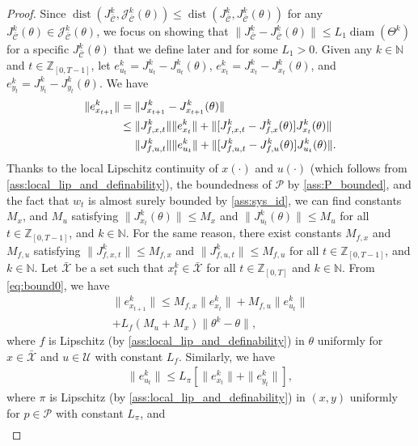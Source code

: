 \documentclass[journal,twoside,web,final]{ieeecolor}
\theoremstyle{definition}
\newcommand{\Z}{\mathbb{Z}}
\newcommand{\N}{\mathbb{N}}
\newcommand{\J}{\mathcal{J}}
\newcommand{\Cb}{{\bar{\mathcal{C}}}}
\begin{document}
\begin{proof}
%
Since $\operatorname*{dist}(J^k_\Cb,\J_\Cb^k(\theta)) \leq \operatorname*{dist}(J^k_\Cb,J_\Cb^k(\theta)) $ for any $J_\Cb^k(\theta)\in\J_\Cb^k(\theta)$, we focus on showing that $\|J_\Cb^k-J_\Cb^k(\theta)\| \leq L_1 \operatorname*{diam}(\Theta^k)$ for a specific $J_\Cb^k(\theta)$ that we define later and for some $L_1>0$. 
Given any $k\in\N$ and $t\in\Z_{[0,T-1]}$, let $e_{u_t}^k = J_{u_t}^k-J_{u_t}^k(\theta)$, $e_{x_t}^k = J_{x_t}^k-J_{x_t}^k(\theta)$, and $e_{y_t}^k = J_{y_t}^k-J_{y_t}^k(\theta)$. We have
\begin{align}
\|e_{x_{t+1}}^k\| & = \|J_{x_{t+1}}^k - J_{x_{t+1}}^k(\theta)\| \notag \\
& \leq \|J_{f,x,t}^k \| \| e_{x_t}^k \| + \|[J_{f,x,t}^k-J_{f,x}^k(\theta)] J_{x_t}^k(\theta)\| \notag \\
& \quad\,\, \|J_{f,u,t}^k\| \| e_{u_t}^k \| + \|[J_{f,u,t}^k-J_{f,u}^k(\theta)] J_{u_t}^k(\theta)\|. \label{eq:bound0}
\end{align}
Thanks to the local Lipschitz continuity of $x(\cdot)$ and $u(\cdot)$ (which follows from \cref{ass:local_lip_and_definability}), the boundedness of $\mathcal{P}$ by \cref{ass:P_bounded}, and the fact that $w_t$ is almost surely bounded by \cref{ass:sys_id}, we can find constants $M_x$, and $M_u$ satisfying $\|J_{x_t}^k(\theta)\| \leq M_x$ and $\|J_{u_t}^k(\theta)\| \leq M_u$ for all $t\in\Z_{[0,T-1]}$, and $k\in\N$. For the same reason, there exist constants $M_{f,x}$ and $M_{f,u}$ satisfying $\|J_{f,x,t}^k\| \leq M_{f,x}$ and $\|J_{f,u,t}^k\| \leq M_{f,u}$ for all $t\in\Z_{[0,T-1]}$, and $k\in\N$. Let $\bar{\mathcal{X}}$ be a set such that $x_t^k\in \bar{\mathcal{X}}$ for all $t\in\Z_{[0,T]}$ and $k\in\N$. From \cref{eq:bound0}, we have
\begin{multline}
\|e_{x_{t+1}}^k\| \leq M_{f,x} \|e_{x_t}^k\| + M_{f,u} \|e_{u_t}^k\| \\ + L_f (M_{u}+M_x)  \|\theta^k-\theta\|, \label{eq:bound1}
\end{multline}
where $f$ is Lipschitz (by \cref{ass:local_lip_and_definability}) in $\theta$ uniformly for $x\in \bar{\mathcal{X}}$ and $u\in \mathcal{U}$ with constant $L_f$. Similarly, we have
\begin{align}
\|e_{u_t}^k\| \leq L_\pi [ \|e_{x_t}^k \| + \|e_{y_t}^k\| ], \label{eq:bound2}
\end{align}
where $\pi$ is Lipschitz (by \cref{ass:local_lip_and_definability}) in $(x,y)$ uniformly for $p\in \mathcal{P}$ with constant $L_\pi$, and
\begin{align}

\end{align}
\end{proof}
\end{document}
